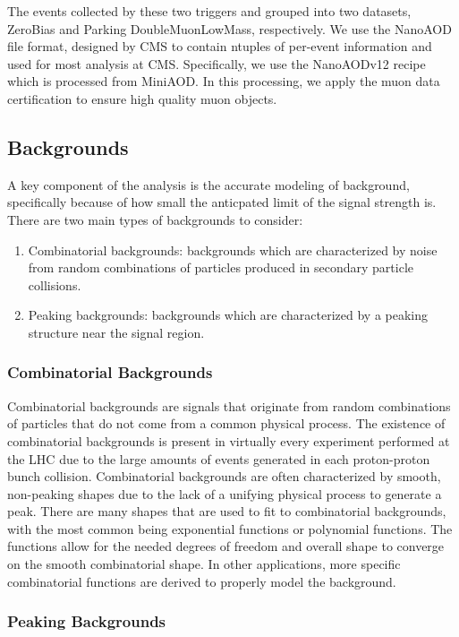 The events collected by these two triggers and grouped into two datasets, ZeroBias and Parking DoubleMuonLowMass, respectively. We use the NanoAOD file format, designed by CMS to contain ntuples of per-event information and used for most analysis at CMS. Specifically, we use the NanoAODv12 recipe which is processed from MiniAOD. In this processing, we apply the muon data certification to ensure high quality muon objects. 

\subsection{Backgrounds}
\label{subsec:backgrounds}

A key component of the analysis is the accurate modeling of background, specifically because of how small the anticpated limit of the signal strength is. There are two main types of backgrounds to consider: 
\begin{enumerate}
    \item Combinatorial backgrounds: backgrounds which are characterized by noise from random combinations of particles produced in secondary particle collisions. 
    \item Peaking backgrounds: backgrounds which are characterized by a peaking structure near the signal region.
\end{enumerate}

\subsubsection{Combinatorial Backgrounds}

Combinatorial backgrounds are signals that originate from random combinations of particles that do not come from a common physical process. The existence of combinatorial backgrounds is present in virtually every experiment performed at the LHC due to the large amounts of events generated in each proton-proton bunch collision. Combinatorial backgrounds are often characterized by smooth, non-peaking shapes due to the lack of a unifying physical process to generate a peak. There are many shapes that are used to fit to combinatorial backgrounds, with the most common being exponential functions or polynomial functions. The functions allow for the needed degrees of freedom and overall shape to converge on the smooth combinatorial shape. In other applications, more specific combinatorial functions are derived to properly model the background. 

\subsubsection{Peaking Backgrounds}

